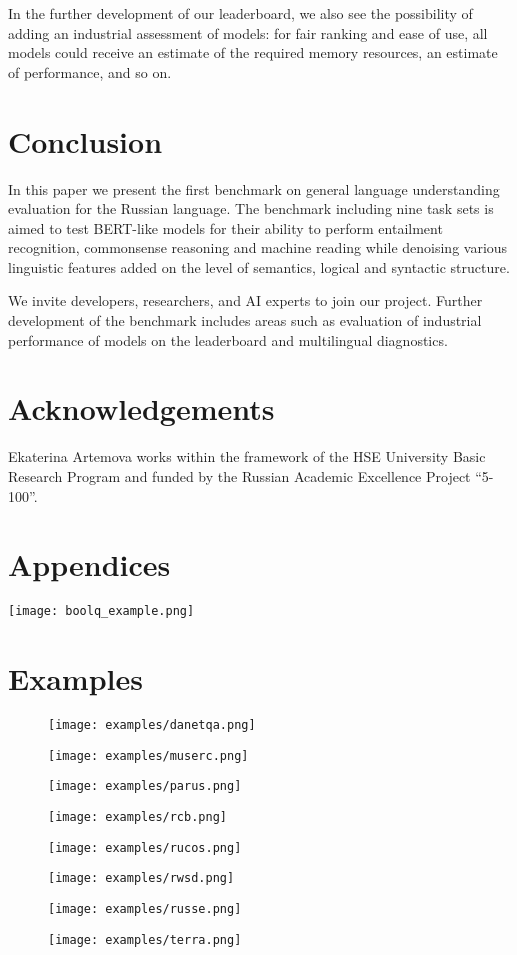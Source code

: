 \documentclass[11pt,a4paper]{article}
\begin{document}
In the further development of our leaderboard, we also see the possibility of adding an industrial assessment of models: for fair ranking and ease of use, all models could receive an estimate of the required memory resources, an estimate of performance, and so on.




\section{Conclusion} \label{sec:conclusion}
In this paper we present the first benchmark on general language understanding evaluation for the Russian language. The benchmark including nine task sets is aimed to test BERT-like models for their ability to perform entailment recognition, commonsense reasoning and machine reading while denoising various linguistic features added on the level of semantics, logical and syntactic structure.



We invite developers, researchers, and AI experts to join our project. 
Further development of the benchmark includes areas such as evaluation of industrial performance of models on the leaderboard and multilingual diagnostics.

\section*{Acknowledgements}
Ekaterina Artemova works within the framework of the HSE University Basic Research Program and funded by the Russian Academic Excellence Project  ``5-100''.




\appendix

\section{Appendices}

\texttt{[image: boolq\_example.png]}

\newpage

\section{Examples}

\begin{figure}[!htp]
\texttt{[image: examples/danetqa.png]}

\texttt{[image: examples/muserc.png]}

\texttt{[image: examples/parus.png]}

\texttt{[image: examples/rcb.png]}

\texttt{[image: examples/rucos.png]}

\texttt{[image: examples/rwsd.png]}

\texttt{[image: examples/russe.png]}

\texttt{[image: examples/terra.png]}

\end{figure}
\end{document}
